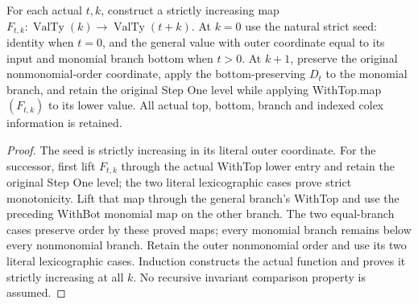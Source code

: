 \begin{theorem}
\label{hir:smooth-actual-value-recursive-dimension-maps}
\leanok
{}
For each actual $t,k$, construct a strictly increasing map
$F_{t,k}:\operatorname{ValTy}(k)\to\operatorname{ValTy}(t+k)$.
At $k=0$ use the natural strict seed: identity when $t=0$, and the general
value with outer coordinate equal to its input and monomial branch bottom
when $t>0$. At $k+1$, preserve the original nonmonomial-order coordinate,
apply the bottom-preserving $D_t$ to the monomial branch, and retain the
original Step One level while applying WithTop.map$(F_{t,k})$ to its lower
value. All actual top, bottom, branch and indexed colex information is retained.
\end{theorem}
\begin{proof}
The seed is strictly increasing in its literal outer coordinate.
For the successor, first lift $F_{t,k}$ through the actual WithTop lower
entry and retain the original Step One level; the two literal lexicographic
cases prove strict monotonicity. Lift that map through the general branch's
WithTop and use the preceding WithBot monomial map on the other branch.
The two equal-branch cases preserve order by these proved maps; every
monomial branch remains below every nonmonomial branch. Retain the outer
nonmonomial order and use its two literal lexicographic cases. Induction
constructs the actual function and proves it strictly increasing at all $k$.
No recursive invariant comparison property is assumed.
\end{proof}

